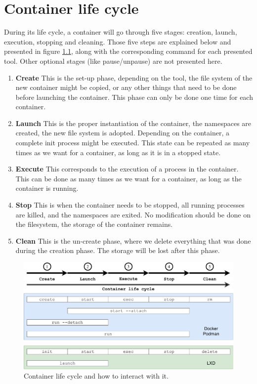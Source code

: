 \chapter{Container life cycle} \label{appendix:container-life-cycle}
During its life cycle, a container will go through five stages: creation, launch, execution, stopping and cleaning.  Those five steps are explained below and presented in figure \ref{fig:container-life-cycle}, along with the corresponding command for each presented tool.  Other optional stages (like pause/unpause) are not presented here.
\begin{enumerate}
\item\textbf{Create} This is the set-up phase, depending on the tool, the file system of the new container might be copied, or any other things that need to be done before launching the container.  This phase can only be done one time for each container.
\item\textbf{Launch} This is the proper instantiation of the container, the namespaces are created, the new file system is adopted.  Depending on the container, a complete init process might be executed.  This state can be repeated as many times as we want for a container, as long as it is in a stopped state.
\item\textbf{Execute} This corresponds to the execution of a process in the container.  This can be done as many times as we want for a container, as long as the container is running.
\item\textbf{Stop} This is when the container needs to be stopped, all running processes are killed, and the namespaces are exited.  No modification should be done on the filesystem, the storage of the container remains.
\item\textbf{Clean} This is the un-create phase, where we delete everything that was done during the creation phase.  The storage will be lost after this phase.
\end{enumerate}
\begin{figure}[!h]
  \begin{center}
    \includegraphics[width=\linewidth]{images/Container-life-cycle.pdf}
    \caption{Container life cycle and how to interact with it.}
    \label{fig:container-life-cycle}
  \end{center}
\end{figure}
